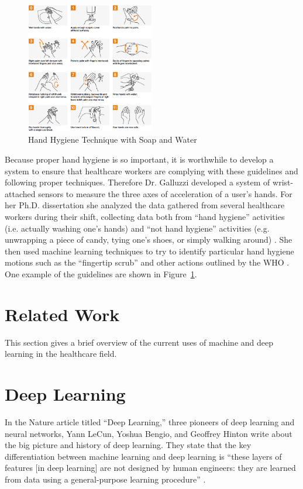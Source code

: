 \documentclass[]{report}
\begin{document}
\begin{figure}
	\centering
	\includegraphics[width=0.5\textwidth]{../images/handhygiene-summary}
	\caption{Hand Hygiene Technique with Soap and Water \cite{who2}}
	\label{hh-guidelines}
\end{figure}

Because proper hand hygiene is so important, it is worthwhile to develop a system to ensure that healthcare workers are complying with these guidelines and following proper techniques. Therefore Dr. Galluzzi developed a system of wrist-attached sensors to measure the three axes of acceleration of a user's hands. For her Ph.D. dissertation she analyzed the data gathered from several healthcare workers during their shift, collecting data both from ``hand hygiene'' activities (i.e. actually washing one's hands) and ``not hand hygiene'' activities (e.g. unwrapping a piece of candy, tying one's shoes, or simply walking around) \cite{Galluzzi}. She then used machine learning techniques to try to identify particular hand hygiene motions such as the ``fingertip scrub'' and other actions outlined by the WHO \cite{Galluzzi}. One example of the guidelines are shown in Figure~\ref{hh-guidelines}.




\section{Related Work}

This section gives a brief overview of the current uses of machine and deep learning in the healthcare field.


\section{Deep Learning}

In the Nature article titled ``Deep Learning,'' three pioneers of deep learning and neural networks, Yann LeCun, Yoshua Bengio, and Geoffrey Hinton write about the big picture and history of deep learning. They state that the key differentiation between machine learning and deep learning is ``these layers of features [in deep learning] are not designed by human engineers: they are learned from data using a general-purpose learning procedure'' \cite{ThreeGiants}. 
\end{document}
